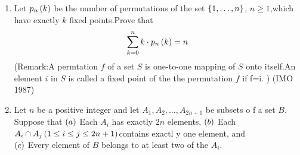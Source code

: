 \begin{enumerate}
\item Let $p_n \left(k\right)$ be the number of permutations of the set $\left\{1,\dots
	    ,n\right\}$, $n\geq1$,which have exactly $k$ fixed points.Prove that 
		                 \begin{align*}   \sum_{k=0}^{n} k \cdot p_n\left(k\right) = n
					             \end{align*}
(Remark:A permtation $f$ of a set $S$ is one-to-one mapping of $S$ onto itself.An element $i$ in $S$ is called a fixed point of the the permutation $f$ if f=i. ) \hfill(IMO 1987)

\item Let $n$ be a positive integer and let $A_1, A_2, \dots, A_{2n+1}$ be subsets o
    f a set $B$. Suppose that 
                 $\left(a\right)$ Each $A_i$ has exactly $2n$ elements,
                  $\left(b\right)$ Each $A_i \cap A_j \left(1\leq i \leq j\leq 2n+1\right)$contains exactl
    y one element, and \\
                  $\left(c\right)$ Every element of $B$ belongs to at least two of the $A_i$.
                  

\end{enumerate}
